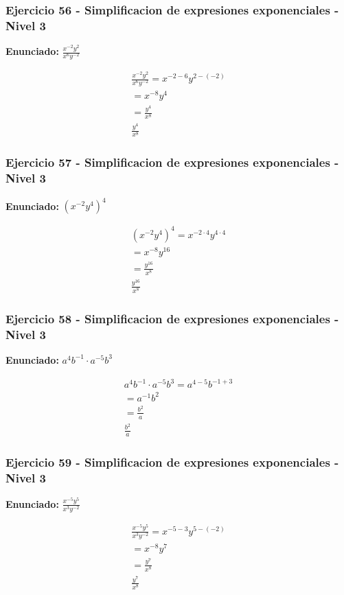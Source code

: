 \documentclass[12pt,a4paper]{article}
\begin{document}
\subsubsection*{Ejercicio 56 - Simplificacion de expresiones exponenciales - Nivel 3}
\textbf{Enunciado:} \(\frac{x^{-2}y^{2}}{x^{6}y^{-2}}\)

\[
\begin{aligned}
\frac{x^{-2}y^{2}}{x^{6}y^{-2}}=x^{-2-6}y^{2-(-2)}\\
=x^{-8}y^{4}\\
=\frac{y^{4}}{x^{8}}\\
\boxed{\frac{y^{4}}{x^{8}}}
\end{aligned}
\]


\subsubsection*{Ejercicio 57 - Simplificacion de expresiones exponenciales - Nivel 3}
\textbf{Enunciado:} \(\left(x^{-2}y^{4}\right)^{4}\)

\[
\begin{aligned}
\left(x^{-2}y^{4}\right)^{4}=x^{-2\cdot 4}y^{4\cdot 4}\\
=x^{-8}y^{16}\\
=\frac{y^{16}}{x^{8}}\\
\boxed{\frac{y^{16}}{x^{8}}}
\end{aligned}
\]


\subsubsection*{Ejercicio 58 - Simplificacion de expresiones exponenciales - Nivel 3}
\textbf{Enunciado:} \(a^{4}b^{-1}\cdot a^{-5}b^{3}\)

\[
\begin{aligned}
a^{4}b^{-1}\cdot a^{-5}b^{3}=a^{4-5}b^{-1+3}\\
=a^{-1}b^{2}\\
=\frac{b^{2}}{a}\\
\boxed{\frac{b^{2}}{a}}
\end{aligned}
\]


\subsubsection*{Ejercicio 59 - Simplificacion de expresiones exponenciales - Nivel 3}
\textbf{Enunciado:} \(\frac{x^{-5}y^{5}}{x^{3}y^{-2}}\)

\[
\begin{aligned}
\frac{x^{-5}y^{5}}{x^{3}y^{-2}}=x^{-5-3}y^{5-(-2)}\\
=x^{-8}y^{7}\\
=\frac{y^{7}}{x^{8}}\\
\boxed{\frac{y^{7}}{x^{8}}}
\end{aligned}
\]
\end{document}
